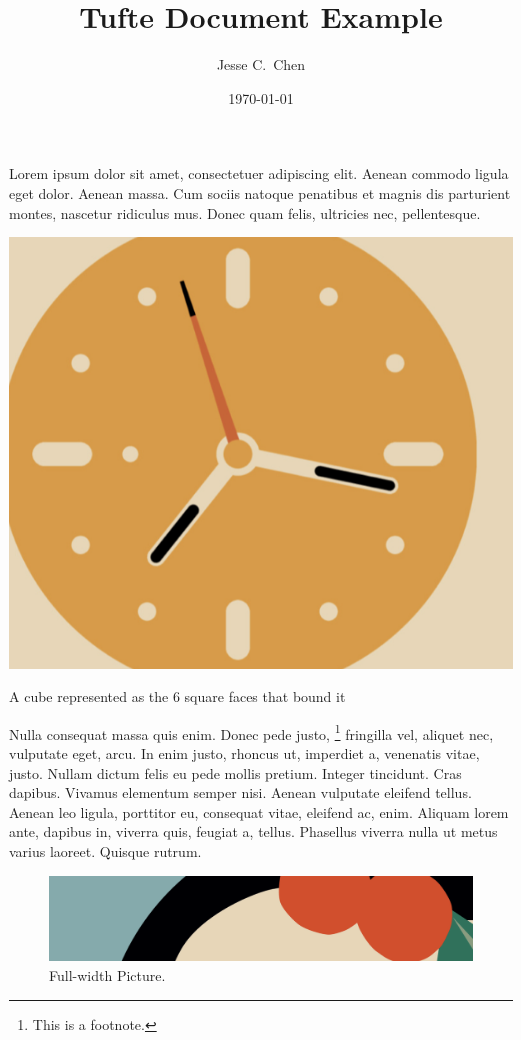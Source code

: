 \documentclass[a4paper]{article}
\title{Tufte Document Example}
\author{Jesse C.\ Chen}
\date{\today}
\begin{document}
\maketitle

\noindent
Lorem ipsum dolor sit amet, consectetuer adipiscing elit. Aenean commodo ligula
eget dolor. Aenean massa. Cum sociis natoque penatibus et magnis dis parturient
montes, nascetur ridiculus mus. Donec quam felis, ultricies nec, pellentesque.

\begin{marginfigure}
	\includegraphics[width=\marginparwidth]{test-1.png}
	\caption{A cube represented as the 6 square faces that bound it}
	\label{fig:brep}
\end{marginfigure}

Nulla consequat massa quis enim. Donec pede justo,
\footnote{\label{foot:first}%
	This is a footnote.
}
fringilla vel, aliquet nec, vulputate eget, arcu. In enim justo, rhoncus ut,
imperdiet a, venenatis vitae, justo. Nullam dictum felis eu pede mollis
pretium. Integer tincidunt. Cras dapibus. Vivamus elementum semper nisi. Aenean
vulputate eleifend tellus. Aenean leo ligula, porttitor eu, consequat vitae,
eleifend ac, enim. Aliquam lorem ante, dapibus in, viverra quis, feugiat a,
tellus. Phasellus viverra nulla ut metus varius laoreet. Quisque rutrum.

\begin{figure}[t!]
	\centering
	\includegraphics[width=\linewidth]{test-2.png}
	\caption{Full-width Picture.}
	\label{fig:full-width}
\end{figure}
\end{document}

